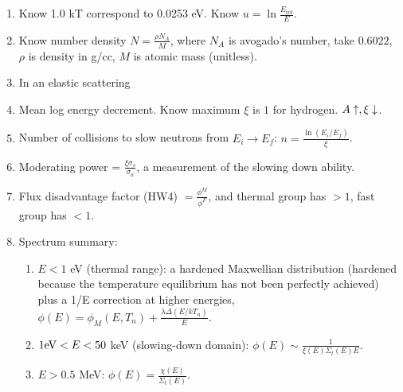 \documentclass{school-22.211-notes}
\date{March 14, 2012}
\begin{document}
\maketitle

\begin{enumerate}
\item Know 1.0 kT correspond to 0.0253 eV. Know $\displaystyle u = \ln \frac{E_{\mathrm{ref}}}{E}$. 

\item Know number density $\displaystyle N = \frac{\rho N_A}{M}$, where $N_A$ is  avogado's number, take $0.6022$, $\rho$ is density in g/cc, $M$ is atomic mass (unitless). 

\item In an elastic scattering

\item Mean log energy decrement. Know maximum $\xi$ is $1$ for hydrogen. $A \uparrow, \xi \downarrow$. 

\item Number of collisions to slow neutrons from $E_i \to E_f$: $\displaystyle n = \frac{ \ln (E_i/E_f)}{\xi}$. 

\item Moderating power = $\frac{\xi \sigma_s}{\sigma_a}$, a measurement of the slowing down ability. 

\item Flux disadvantage factor (HW4) $\displaystyle = \frac{\phi^M}{\phi^F}$, and thermal group has $>1$, fast group has $<1$. 

\item Spectrum summary:
  \begin{enumerate}
  \item $E < 1$ eV (thermal range): a hardened Maxwellian distribution (hardened because the temperature equilibrium has not been perfectly achieved) plus a 1/E correction at higher energies, $\phi(E) = \phi_M (E, T_n) + \frac{ \lambda \Delta (E/kT_n) }{E}$. 

  \item $1 \mathrm{eV} < E < 50$ keV (slowing-down domain): $\phi(E) \sim \frac{1}{\xi(E) \Sigma_t(E) E}$. 

  \item $E > 0.5$ MeV: $\phi(E) = \frac{\chi(E)}{\Sigma_t(E)}$.
  \end{enumerate}


\end{enumerate}
\end{document}
